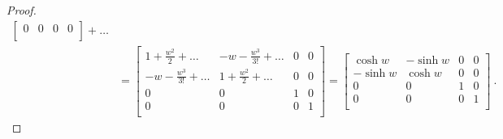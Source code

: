 \begin{example}
\begin{proof}
\begin{equation*}
\begin{aligned}
\begin{bmatrix}
                    0 & 0 & 0 & 0 \\
                \end{bmatrix} + \ldots \\ & = \begin{bmatrix}
                    1 + \frac{w^2}{2} + \ldots & - w - \frac{w^3}{3!} + \ldots & 0 & 0 \\
                    - w - \frac{w^3}{3!} + \ldots & 1 + \frac{w^2}{2} + \ldots & 0 & 0 \\
                    0 & 0 & 1 & 0 \\
                    0 & 0 & 0 & 1 \\
                \end{bmatrix} = \begin{bmatrix}
                    \cosh w & - \sinh w & 0 & 0 \\
                    - \sinh w & \cosh w & 0 & 0 \\
                    0 & 0 & 1 & 0 \\
                    0 & 0 & 0 & 1 \\    
                \end{bmatrix} ~.
            \end{aligned}
            \end{equation*}
        \end{proof}


\end{example}

